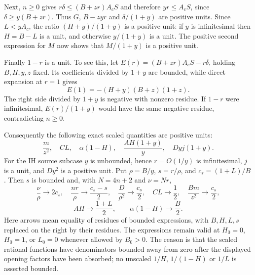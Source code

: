 Next, $n\ge0$ gives $r\delta\le(B+zr)A_cS$ and therefore
$yr\le A_cS$, since $\delta\ge y(B+zr)$.
Thus $G$, $B-zyr$ and $\delta/(1+y)$ are positive units.
Since $L<yA_c$, the ratio $(H+y)/(1+y)$ is a positive unit: if $y$
is infinitesimal then $H=B-L$ is a unit, and otherwise $y/(1+y)$
is a unit. The positive second expression for $M$ now shows that
$M/(1+y)$ is a positive unit.

Finally $1-r$ is a unit. To see this, let
$E(r)=(B+zr)A_cS-r\delta$, holding $B,H,y,z$ fixed.
Its coefficients divided by $1+y$ are bounded, while direct expansion
at $r=1$ gives
\[
 E(1)=-(H+y)(B+z)(1+z).
\]
The right side divided by $1+y$ is negative with nonzero residue.
If $1-r$ were infinitesimal, $E(r)/(1+y)$ would have the same negative
residue, contradicting $n\ge0$.

Consequently the following exact scaled quantities are positive units:
\[
 \frac m{z^2},\quad CL,\quad\alpha(1-H),\quad
 \frac{AH(1+y)}y,\quad Dyj(1+y).
\tag{GE2}
\]
For the IH source subcase $y$ is unbounded, hence $r=O(1/y)$ is
infinitesimal, $j$ is a unit, and $Dy^2$ is a positive unit.
Put $\rho=B/y$, $s=r/\rho$, and $c_s=(1+L)/B$.
Then $s$ is bounded and, with $N=4n+2$ and $\nu=Nr$,
\[
 \frac\nu\rho\longrightarrow2c_s,\quad
 \frac{nr}\rho\longrightarrow\frac{c_s-s}{2},\quad
 \frac D{\rho^2}\longrightarrow\frac{c_s}{2},\quad
 CL\longrightarrow\frac12,\quad
 \frac{Bm}{z^2}\longrightarrow\frac{c_s}{2},
\]
\[
 AH\longrightarrow\frac{1+L}{2},\qquad
 \alpha(1-H)\longrightarrow\frac B2.
\tag{GE3}
\]
Here arrows mean equality of residues of bounded expressions, with
$B,H,L,s$ replaced on the right by their residues. The expressions
remain valid at $H_0=0$, $H_0=1$, or $L_0=0$ whenever allowed by $B_0>0$.
The reason is that the scaled rational functions have denominators
bounded away from zero after the displayed opening factors have
been absorbed; no unscaled $1/H$, $1/(1-H)$ or $1/L$ is asserted bounded.
